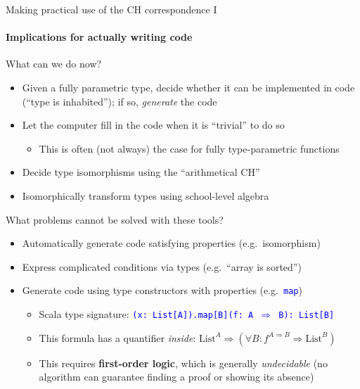 \documentclass[english]{beamer}
\begin{document}
\begin{frame}{Making practical use of the CH correspondence I}


\framesubtitle{Implications for actually writing code}

What can we do now?
\begin{itemize}
\item Given a fully parametric type, decide whether it can be implemented
in code (``type is inhabited''); if so, \emph{generate} the code
\item Let the computer fill in the code when it is ``trivial'' to do so
\begin{itemize}
\item This is often (not always) the case for fully type-parametric functions
\end{itemize}
\item Decide type isomorphisms using the ``arithmetical CH''
\item Isomorphically transform types using school-level algebra
\end{itemize}
What problems cannot be solved with these tools?
\begin{itemize}
\item Automatically generate code satisfying properties (e.g.\ isomorphism) 
\item Express complicated conditions via types (e.g.\ ``array is sorted'') 
\item Generate code using type constructors with properties (e.g.\ \texttt{\textcolor{blue}{\footnotesize{}map}})
\begin{itemize}
\item Scala type signature: \texttt{\textcolor{blue}{\footnotesize{}(x:\ List{[}A{]}).map{[}B{]}(f:\ A
$\Rightarrow$ B):\ List{[}B{]}}}{\footnotesize \par}
\item This formula has a quantifier \emph{inside}: $\text{List}^{A}\Rightarrow(\forall B:f^{A\Rightarrow B}\Rightarrow\text{List}^{B})$
\item This requires \textbf{first-order logic}, which is generally \emph{undecidable}
(no algorithm can guarantee finding a proof or showing its absence)
\end{itemize}
\end{itemize}
\end{frame}
\end{document}

